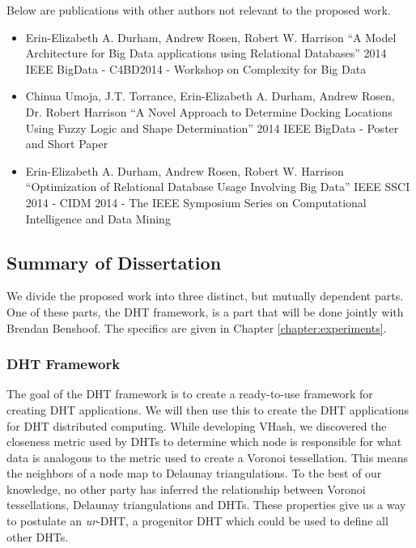 Below are publications with other authors not relevant to the proposed work.
\begin{itemize}
	\item  Erin-Elizabeth A. Durham, Andrew Rosen, Robert W. Harrison
	``A Model Architecture for Big Data applications using Relational Databases''
	2014 IEEE BigData - C4BD2014 - Workshop on Complexity for Big Data  \cite{durham2014model}
	\item Chinua Umoja, J.T. Torrance, Erin-Elizabeth A. Durham, Andrew Rosen, Dr. Robert Harrison
	``A Novel Approach to Determine Docking Locations Using Fuzzy Logic and Shape Determination''
	2014 IEEE BigData - Poster and Short Paper \cite{umoja2014novel}
	\item  Erin-Elizabeth A. Durham, Andrew Rosen, Robert W. Harrison
	``Optimization of Relational Database Usage Involving Big Data'' 
	IEEE SSCI 2014 - CIDM 2014 - The IEEE Symposium Series on Computational Intelligence and Data Mining \cite{durham2014optimization}
\end{itemize}



\subsection{Summary of Dissertation}


We divide the proposed work into three distinct, but mutually dependent parts.
One of these parts, the DHT framework, is a part that will be done jointly with Brendan Benshoof.
The specifics are given in Chapter \ref{chapter:experiments}.


\subsubsection{DHT Framework}
The goal of the DHT framework is to create a ready-to-use framework for creating DHT applications.
We will then use this to create the DHT applications for DHT distributed computing.
While developing VHash, we discovered the closeness metric used by DHTs to determine which node is responsible for what data is analogous to the metric used to create a Voronoi tessellation.
This means the neighbors of a node map to Delaunay triangulations. 
To the best of our knowledge, no other party has inferred the relationship between Voronoi tessellations, Delaunay triangulations and DHTs.
These properties give us a way to postulate an \textit{ur}-DHT, a progenitor DHT which could be used to define all other DHTs.

